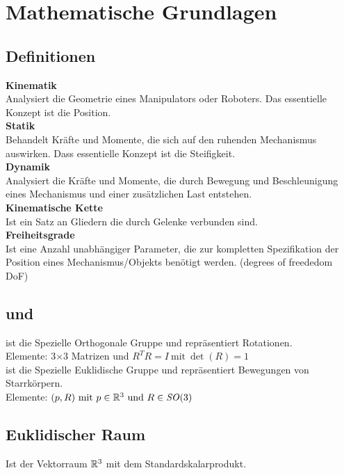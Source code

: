 

\section{Mathematische Grundlagen}%
\label{math:sec:mathematische-grundlagen}

\subsection{Definitionen}%
\label{math:sub:definitionen}
\textbf{Kinematik}\\
Analysiert die Geometrie eines Manipulators oder Roboters. Das essentielle Konzept ist die Position.\\

\textbf{Statik}\\
Behandelt Kräfte und Momente, die sich auf den ruhenden Mechanismus auswirken. Dass essentielle Konzept
ist die Steifigkeit.\\

\textbf{Dynamik}\\
Analysiert die Kräfte und Momente, die durch Bewegung und Beschleunigung eines Mechanismus und einer
zusätzlichen Last entstehen.\\

\textbf{Kinematische Kette}\\
Ist ein Satz an Gliedern die durch Gelenke verbunden sind.\\

\textbf{Freiheitsgrade}\\
Ist eine Anzahl unabhängiger Parameter, die zur kompletten Spezifikation der Position eines
Mechanismus/Objekts benötigt werden. (degrees of freededom DoF)

\subsection{\SO und \SE}%
\label{math:sub:so-se}
\SO{} ist die Spezielle Orthogonale Gruppe und repräsentiert Rotationen.\\
Elemente: 3\(\times\)3 Matrizen und \(R^{T}R = I\ \text{mit}\ \det(R) = 1\)\\
\SE{} ist die Spezielle Euklidische Gruppe und repräsentiert Bewegungen von Starrkörpern.\\
Elemente: \((p, R)\ \text{mit}\ p \in \mathbb{R}^3\ \text{und}\ R \in \mathit{SO}(3)\)

\subsection{Euklidischer Raum}%
\label{math:sub:euklidischer-raum}
Ist der Vektorraum \(\mathbb{R}^3\) mit dem Standardskalarprodukt.

